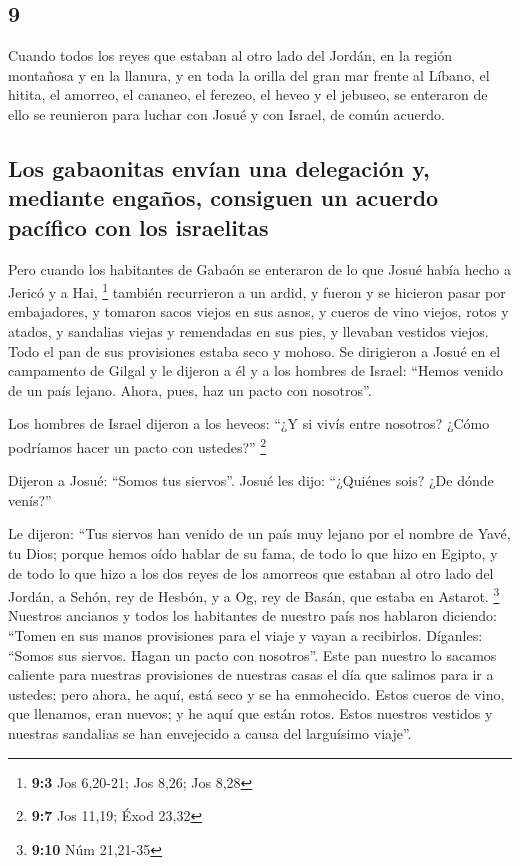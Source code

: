 \begin{paracol}{2}
\hypertarget{section-16}{%
\section{9}\label{section-16}}

 Cuando todos los reyes que estaban al otro lado del
Jordán, en la región montañosa y en la llanura, y en toda la orilla del
gran mar frente al Líbano, el hitita, el amorreo, el cananeo, el
ferezeo, el heveo y el jebuseo, se enteraron de ello  se
reunieron para luchar con Josué y con Israel, de común acuerdo.

\hypertarget{los-gabaonitas-envuxedan-una-delegaciuxf3n-y-mediante-engauxf1os-consiguen-un-acuerdo-pacuxedfico-con-los-israelitas}{%
\subsection{Los gabaonitas envían una delegación y, mediante engaños,
consiguen un acuerdo pacífico con los
israelitas}\label{los-gabaonitas-envuxedan-una-delegaciuxf3n-y-mediante-engauxf1os-consiguen-un-acuerdo-pacuxedfico-con-los-israelitas}}

 Pero cuando los habitantes de Gabaón se enteraron de lo
que Josué había hecho a Jericó y a Hai, \footnote{\textbf{9:3} Jos
  6,20-21; Jos 8,26; Jos 8,28}  también recurrieron a un
ardid, y fueron y se hicieron pasar por embajadores, y tomaron sacos
viejos en sus asnos, y cueros de vino viejos, rotos y atados,
 y sandalias viejas y remendadas en sus pies, y llevaban
vestidos viejos. Todo el pan de sus provisiones estaba seco y mohoso.
 Se dirigieron a Josué en el campamento de Gilgal y le
dijeron a él y a los hombres de Israel: ``Hemos venido de un país
lejano. Ahora, pues, haz un pacto con nosotros''.

 Los hombres de Israel dijeron a los heveos: ``¿Y si vivís
entre nosotros? ¿Cómo podríamos hacer un pacto con ustedes?''
\footnote{\textbf{9:7} Jos 11,19; Éxod 23,32}

 Dijeron a Josué: ``Somos tus siervos''. Josué les dijo:
``¿Quiénes sois? ¿De dónde venís?''

 Le dijeron: ``Tus siervos han venido de un país muy
lejano por el nombre de Yavé, tu Dios; porque hemos oído hablar de su
fama, de todo lo que hizo en Egipto,  y de todo lo que
hizo a los dos reyes de los amorreos que estaban al otro lado del
Jordán, a Sehón, rey de Hesbón, y a Og, rey de Basán, que estaba en
Astarot. \footnote{\textbf{9:10} Núm 21,21-35}  Nuestros
ancianos y todos los habitantes de nuestro país nos hablaron diciendo:
``Tomen en sus manos provisiones para el viaje y vayan a recibirlos.
Díganles: ``Somos sus siervos. Hagan un pacto con nosotros''.
 Este pan nuestro lo sacamos caliente para nuestras
provisiones de nuestras casas el día que salimos para ir a ustedes; pero
ahora, he aquí, está seco y se ha enmohecido.  Estos
cueros de vino, que llenamos, eran nuevos; y he aquí que están rotos.
Estos nuestros vestidos y nuestras sandalias se han envejecido a causa
del larguísimo viaje''.


\end{paracol}
